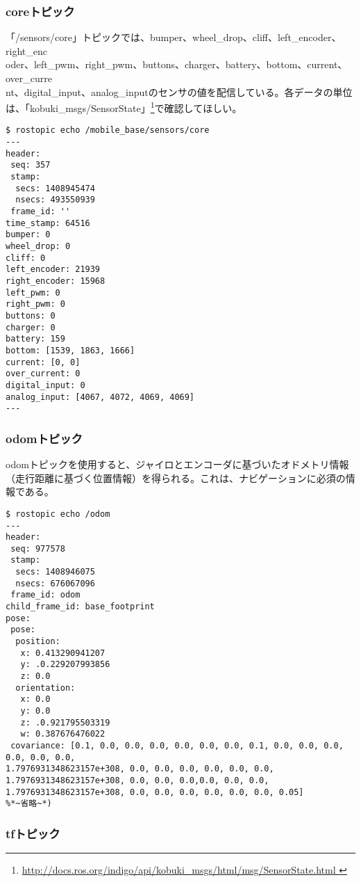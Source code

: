 \subsubsection{coreトピック}

「/sensors/core」トピックでは、bumper、wheel\_drop、cliff、left\_encoder、right\_enc\\oder、left\_pwm、right\_pwm、buttons、charger、battery、bottom、current、over\_curre\\nt、digital\_input、analog\_inputのセンサの値を配信している。各データの単位は、「kobuki\_msgs/SensorState」\footnote{\url{http://docs.ros.org/indigo/api/kobuki\_msgs/html/msg/SensorState.html
}}で確認してほしい。

\begin{lstlisting}[language=ROS]
$ rostopic echo /mobile_base/sensors/core
---
header:
 seq: 357
 stamp:
  secs: 1408945474
  nsecs: 493550939
 frame_id: ''
time_stamp: 64516
bumper: 0
wheel_drop: 0
cliff: 0
left_encoder: 21939
right_encoder: 15968
left_pwm: 0
right_pwm: 0
buttons: 0
charger: 0
battery: 159
bottom: [1539, 1863, 1666]
current: [0, 0]
over_current: 0
digital_input: 0
analog_input: [4067, 4072, 4069, 4069]
---
\end{lstlisting}

\subsubsection{odomトピック}

odomトピックを使用すると、ジャイロとエンコーダに基づいたオドメトリ情報（走行距離に基づく位置情報）を得られる。これは、ナビゲーションに必須の情報である。

\begin{lstlisting}[language=ROS]
$ rostopic echo /odom
---
header:
 seq: 977578
 stamp:
  secs: 1408946075
  nsecs: 676067096
 frame_id: odom
child_frame_id: base_footprint
pose:
 pose:
  position:
   x: 0.413290941207
   y: .0.229207993856
   z: 0.0
  orientation:
   x: 0.0
   y: 0.0
   z: .0.921795503319
   w: 0.387676476022
 covariance: [0.1, 0.0, 0.0, 0.0, 0.0, 0.0, 0.0, 0.1, 0.0, 0.0, 0.0, 0.0, 0.0, 0.0,
1.7976931348623157e+308, 0.0, 0.0, 0.0, 0.0, 0.0, 0.0, 1.7976931348623157e+308, 0.0, 0.0, 0.0,0.0, 0.0, 0.0, 1.7976931348623157e+308, 0.0, 0.0, 0.0, 0.0, 0.0, 0.0, 0.05]
%*~省略~*)
\end{lstlisting}

\subsubsection{tfトピック}

